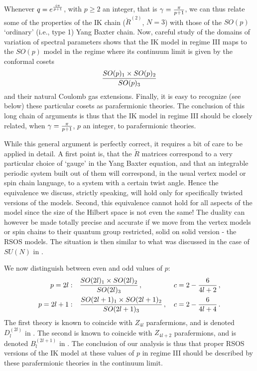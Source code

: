 \documentclass[11pt]{article}
\begin{document}
Whenever  $q=e^{i\pi\over p+1}$, with $p \ge 2$ an integer, that is $\gamma={\pi\over p+1}$, we can thus  relate some of  the properties of the IK chain ($\check{R}^{(2)}$, $N=3$) with those of the $SO(p)$ `ordinary' (i.e., type 1) Yang Baxter chain. Now,  careful study of the domains of variation of spectral parameters shows that the  IK model in regime III maps to the  $SO(p)$ model in the regime where its continuum limit \cite{deVega87} is given by  the conformal cosets
%
\begin{equation}
{SO(p)_1\times SO(p)_2\over SO(p)_3} 
\end{equation}
%
and their natural Coulomb gas extensions. Finally, it is easy to recognize (see below) these particular cosets as parafermionic theories. The conclusion of this long chain of arguments is thus that the IK model in regime III should be closely related, when $\gamma={\pi\over p+1}$, $p$ an integer, to parafermionic theories. 

While this general argument is perfectly correct, it requires a bit of care to be applied in detail.  A first  point is, that the $\check{R}$ matrices correspond to a very particular choice of `gauge' in the Yang Baxter equation, and that an integrable  periodic system  built out of them will correspond, in the usual vertex model or spin chain language, to a system with a certain twist angle. Hence the equivalence we discuss, strictly speaking, will  hold only  for specifically twisted versions of the models.  Second, this equivalence cannot hold for all aspects of the model since the size of the Hilbert space is not even the same! 
The duality can however be made totally precise and accurate if we move from the vertex models or spin chains to their quantum group restricted, solid on solid version - the RSOS models. The situation is then similar to what was discussed in the case of $SU(N)$ in  \cite{SalAlt91}. 

We now distinguish between even and odd values of $p$:
%
\begin{eqnarray}
p=2l : & & {SO(2l)_1\times SO(2l)_2\over SO(2l)_3} \,, \qquad \qquad \  \, c=2-{6\over 4l+2} \,, \\
p=2l+1 : & & {SO(2l+1)_1\times SO(2l+1)_2\over SO(2l+1)_3} \,, \quad c=2-{6\over 4l+4} \,.
\end{eqnarray}
%
The first theory is known to coincide with $Z_{4l}$ parafermions, and is denoted $D_l^{(2l)}$ in \cite{Fateev}. The second is known to coincide with $Z_{4l+2}$ parafermions, and is denoted $B_l^{(2l+1)}$ in \cite{Fateev}. The conclusion of our analysis is thus that proper RSOS versions of the IK model at these values of $p$ in regime III should be described by  these parafermionic theories in the continuum limit. 
\end{document}
